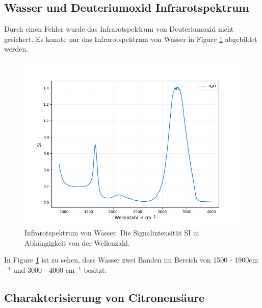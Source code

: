 \documentclass[10pt,a4paper]{article}
\begin{document}
		\subsection{Wasser und Deuteriumoxid Infrarotspektrum}
			Durch einen Fehler wurde das Infrarotspektrum von Deuteriumoxid nicht gesichert. Es konnte nur das Infrarotspektrum von Wasser in Figure \ref{fig:water} abgebildet werden.\\

		
			\begin{figure}[H]
				\centering
				\includegraphics[scale=0.65]{Onlywater.png}
				\caption{Infrarotspektrum von Wasser. Die Signalintensität SI in Abhängigkeit von der Wellenzahl.}
				\label{fig:water}
			\end{figure}
		
			In Figure \ref{fig:water} ist zu sehen, dass Wasser zwei Banden im Bereich von 1500 - 1900cm$^{-1}$ und 3000 - 4000  cm$^{-1}$ besitzt.
	
		\subsection{Charakterisierung von Citronensäure}
		
\end{document}
